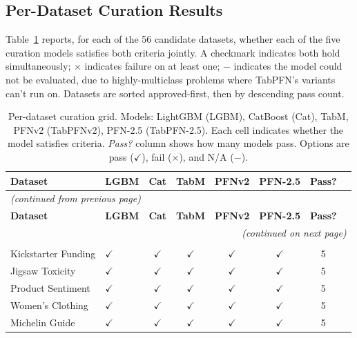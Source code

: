 \subsection{Per-Dataset Curation Results}\label{app:text_curation_grid}

Table~\ref{tab:text_curation_grid} reports, for each of the 56 candidate datasets, whether each of the five curation models satisfies both criteria jointly. A checkmark indicates both hold simultaneously; $\times$ indicates failure on at least one; $-$ indicates the model could not be evaluated, due to highly-multiclass problems where TabPFN's variants can't run on. Datasets are sorted approved-first, then by descending pass count.

\begin{longtable}{llcccccr}
\caption{Per-dataset curation grid. Models: LightGBM (LGBM), CatBoost (Cat), TabM, PFNv2 (TabPFNv2), PFN-2.5 (TabPFN-2.5). Each cell indicates whether the model satisfies criteria. \textit{Pass?} column shows how many models pass. Options are pass ($\checkmark$), fail ($\times$), and N/A ($-$).}
\label{tab:text_curation_grid}\\
\toprule
\textbf{Dataset} & \textbf{LGBM} & \textbf{Cat} & \textbf{TabM} & \textbf{PFNv2} & \textbf{PFN-2.5} & \textbf{Pass?} \\
\midrule
\endfirsthead
\multicolumn{8}{l}{\small\textit{(continued from previous page)}}\\[2pt]
\toprule
\textbf{Dataset} & \textbf{LGBM} & \textbf{Cat} & \textbf{TabM} & \textbf{PFNv2} & \textbf{PFN-2.5} & \textbf{Pass?} \\
\midrule
\endhead
\midrule
\multicolumn{8}{r}{\small\textit{(continued on next page)}}\\
\endfoot
\bottomrule
\endlastfoot
\multicolumn{8}{l}{\textit{Approved (23 datasets)}} \\[2pt]
Kickstarter Funding  & $\checkmark$ & $\checkmark$ & $\checkmark$ & $\checkmark$ & $\checkmark$ & 5 \\
Jigsaw Toxicity    & $\checkmark$ & $\checkmark$ & $\checkmark$ & $\checkmark$ & $\checkmark$ & 5 \\
Product Sentiment  & $\checkmark$ & $\checkmark$ & $\checkmark$ & $\checkmark$ & $\checkmark$ & 5 \\
Women's Clothing & $\checkmark$ & $\checkmark$ & $\checkmark$ & $\checkmark$ & $\checkmark$ & 5 \\
Michelin Guide  & $\checkmark$ & $\checkmark$ & $\checkmark$ & $\checkmark$ & $\checkmark$ & 5 \\

\end{longtable}
